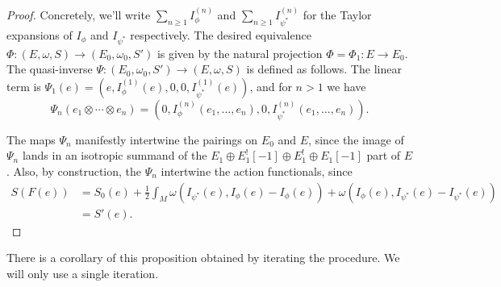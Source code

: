 \documentclass[10pt, oneside]{article}
\begin{document}
\begin{proof}
Concretely, we'll write $\sum_{n \ge 1} I^{(n)}_\phi$ and $\sum_{n \ge 1} I^{(n)}_{\psi^*}$ for the Taylor expansions of $I_\phi$ and $I_{\psi^*}$ respectively.  
The desired equivalence $\Phi : (E, \omega, S) \to (E_0, \omega_0, S')$ is given by the natural projection $\Phi = \Phi_1 : E \to E_0$. 
The quasi-inverse $\Psi : (E_0, \omega_0, S') \to (E, \omega, S)$ is defined as follows.
The linear term is $\Psi_1(e) = (e, I^{(1)}_{\phi}(e),0,0, I^{(1)}_{\psi^*}(e))$, and for $n > 1$ we have 
\[\Psi_n(e_1\otimes \cdots \otimes e_n) = (0, I^{(n)}_{\phi}(e_1, \ldots, e_n), 0, I^{(n)}_{\psi^*}(e_1, \ldots, e_n)).\]

The maps $\Psi_n$ manifestly intertwine the pairings on $E_0$ and $E$, since the image of $\Psi_n$ lands in an isotropic summand of the $E_1\oplus E_1^![-1]\oplus E_1^!\oplus E_1[-1]$ part of $E$.  
Also, by construction, the $\Psi_n$ intertwine the action functionals, since
\begin{align*}
S(F(e)) &= S_0(e) + \frac{1}{2} \int_M \omega(I_{\psi^*}(e), I_\phi(e) - I_\phi(e)) + \omega(I_\phi (e), I_{\psi^*}(e) - I_{\psi^*}(e)) \\
&= S'(e).
\end{align*}
\end{proof}

There is a corollary of this proposition obtained by iterating the procedure. 
We will only use a single iteration. 
\end{document}
